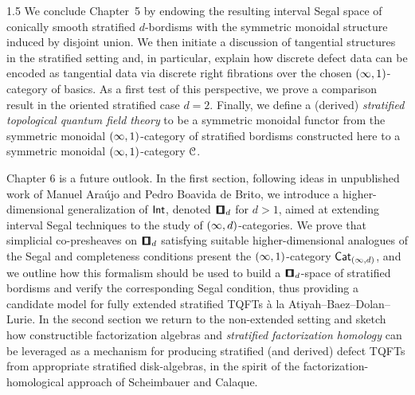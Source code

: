 \documentclass{amsbook}
\begin{document}
\begin{spacing}{1.5}
We conclude Chapter~5 by endowing the resulting interval Segal space of conically smooth stratified $d$-bordisms with the symmetric monoidal structure induced by disjoint union. We then initiate a discussion of tangential structures in the stratified setting and, in particular, explain how discrete defect data can be encoded as tangential data via discrete right fibrations over the chosen $(\operatorname{\infty},1)$-category of basics. As a first test of this perspective, we prove a comparison result in the oriented stratified case $d=2$. Finally, we define a (derived) \emph{stratified topological quantum field theory} to be a symmetric monoidal functor from the symmetric monoidal $(\operatorname{\infty},1)$-category of stratified bordisms constructed here to a symmetric monoidal $(\operatorname{\infty},1)$-category $\mathcal C$. 

Chapter 6 is a future outlook. In the first section, following ideas in unpublished work of Manuel Ara\'ujo and Pedro Boavida de Brito, we introduce a higher-dimensional generalization of $\operatorname{\mathsf{Int}}$, denoted $\cube_d$ for $d>1$, aimed at extending interval Segal techniques to the study of $(\operatorname{\infty},d)$-categories. We prove that simplicial co-presheaves on $\cube_d$ satisfying suitable higher-dimensional analogues of the Segal and completeness conditions present the $(\operatorname{\infty},1)$-category $\operatorname{{\sf Cat}}_{(\operatorname{\infty},d)}$, and we outline how this formalism should be used to build a $\cube_d$-space of stratified bordisms and verify the corresponding Segal condition, thus providing a candidate model for fully extended stratified TQFTs \`a la Atiyah--Baez--Dolan--Lurie. In the second section we return to the non-extended setting and sketch how constructible factorization algebras and \emph{stratified factorization homology} can be leveraged as a mechanism for producing stratified (and derived) defect TQFTs from appropriate stratified disk-algebras, in the spirit of the factorization-homological approach of Scheimbauer and Calaque.

\end{spacing}
\end{document}
